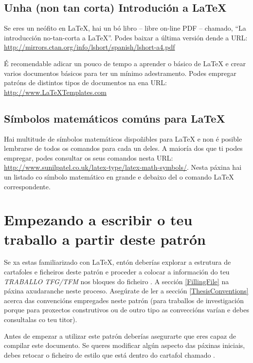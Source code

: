 \subsection{Unha (non tan corta) Introdución a \LaTeX{}}

Se eres un neófito en \LaTeX{}, hai un bó libro -- libre on-line PDF -- chamado, \enquote{La introducción no-tan-corta a \LaTeX{}}. Podes baixar a última versión dende a URL: \url{http://mirrors.ctan.org/info/lshort/spanish/lshort-a4.pdf}


É recomendable adicar un pouco de tempo a aprender o básico de \LaTeX{} e crear varios documentos básicos para ter un mínimo adestramento. Podes empregar patróns de distintos tipos de documentos na ena URL: \url{http://www.LaTeXTemplates.com}\\ 


\subsection{Símbolos matemáticos comúns para \LaTeX{}}
Hai multitude de símbolos matemáticos dispoñibles para \LaTeX{} e non é posible lembrarse de todos os comandos para cada un deles. A maioría dos que ti podes empregar, podes consultar os seus comandos nesta URL: \url{http://www.sunilpatel.co.uk/latex-type/latex-math-symbols/}. Nesta páxina hai un listado co símbolo matemático en grande e debaixo del o comando \LaTeX{} correspondente.


\section{Empezando a escribir o teu traballo a partir deste patrón}

Se xa estas familiarizado con \LaTeX{}, entón deberías explorar a estrutura de cartafoles e ficheiros deste patrón e proceder a colocar a información do teu \emph{TRABALLO TFG/TFM} nos bloques do ficheiro . A sección \ref{FillingFile} na páxina \pageref{FillingFile} axudaranche neste proceso. Asegúrate de ler a sección \ref{ThesisConventions} acerca das convencións empregades neste patrón (para traballos de investigación porque para proxectos construtivos ou de outro tipo as conveccións varían e debes consultalas co teu titor).


Antes de empezar a utilizar este patrón deberías asegurarte que eres capaz de compilar este documento. Se queres modificar algún aspecto das páxinas iniciais, debes retocar o ficheiro de estilo  que está dentro do cartafol chamado .


